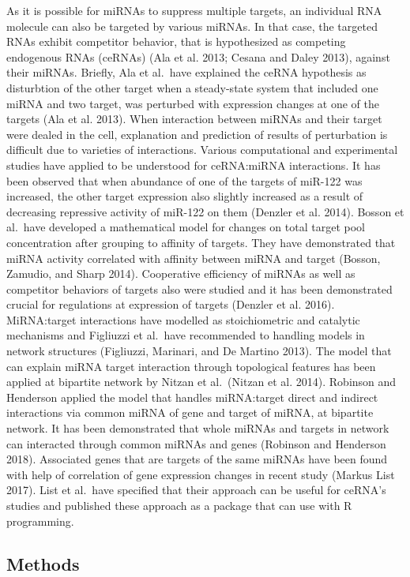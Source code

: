\documentclass[]{article}
\begin{document}
As it is possible for miRNAs to suppress multiple targets, an individual
RNA molecule can also be targeted by various miRNAs. In that case, the
targeted RNAs exhibit competitor behavior, that is hypothesized as
competing endogenous RNAs (ceRNAs) (Ala et al. 2013; Cesana and Daley
2013), against their miRNAs. Briefly, Ala et al.~have explained the
ceRNA hypothesis as disturbtion of the other target when a steady-state
system that included one miRNA and two target, was perturbed with
expression changes at one of the targets (Ala et al. 2013). When
interaction between miRNAs and their target were dealed in the cell,
explanation and prediction of results of perturbation is difficult due
to varieties of interactions. Various computational and experimental
studies have applied to be understood for ceRNA:miRNA interactions. It
has been observed that when abundance of one of the targets of miR-122
was increased, the other target expression also slightly increased as a
result of decreasing repressive activity of miR-122 on them (Denzler et
al. 2014). Bosson et al.~have developed a mathematical model for changes
on total target pool concentration after grouping to affinity of
targets. They have demonstrated that miRNA activity correlated with
affinity between miRNA and target (Bosson, Zamudio, and Sharp 2014).
Cooperative efficiency of miRNAs as well as competitor behaviors of
targets also were studied and it has been demonstrated crucial for
regulations at expression of targets (Denzler et al. 2016). MiRNA:target
interactions have modelled as stoichiometric and catalytic mechanisms
and Figliuzzi et al.~have recommended to handling models in network
structures (Figliuzzi, Marinari, and De Martino 2013). The model that
can explain miRNA target interaction through topological features has
been applied at bipartite network by Nitzan et al.~(Nitzan et al. 2014).
Robinson and Henderson applied the model that handles miRNA:target
direct and indirect interactions via common miRNA of gene and target of
miRNA, at bipartite network. It has been demonstrated that whole miRNAs
and targets in network can interacted through common miRNAs and genes
(Robinson and Henderson 2018). Associated genes that are targets of the
same miRNAs have been found with help of correlation of gene expression
changes in recent study (Markus List 2017). List et al.~have specified
that their approach can be useful for ceRNA's studies and published
these approach as a package that can use with R programming.

\hypertarget{methods}{%
\subsection{Methods}\label{methods}}
\end{document}
